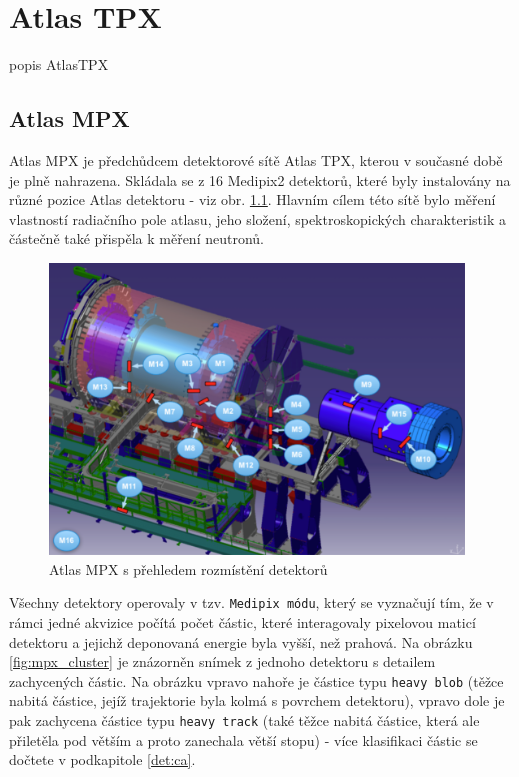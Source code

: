 

\chapter{Atlas TPX}\label{atlas}
\todo popis AtlasTPX

\section{Atlas MPX}\label{atlas:mpx}
Atlas MPX\cite{Vykydal200935}\cite{atlasmpx} je předchůdcem detektorové sítě Atlas TPX, kterou v současné době je plně nahrazena. Skládala se z 16 Medipix2 detektorů, které byly instalovány na různé pozice Atlas detektoru - viz obr. \ref{fig:mpx_positions}. Hlavním cílem této sítě bylo měření vlastností radiačního pole atlasu, jeho složení, spektroskopických charakteristik a částečně také přispěla k měření neutronů. 

\begin{figure}[ht]
	\begin{center}
		\includegraphics[width=11cm]{figures/mpx_positions.png}
		\caption{Atlas MPX s přehledem rozmístění detektorů}
		\label{fig:mpx_positions}
	\end{center}
\end{figure}

Všechny detektory operovaly v tzv. \texttt{Medipix módu}, který se vyznačují tím, že v rámci jedné akvizice počítá počet částic, které interagovaly pixelovou maticí detektoru a jejichž deponovaná energie byla vyšší, než prahová. Na obrázku \ref{fig:mpx_cluster} je znázorněn snímek z jednoho detektoru s detailem zachycených částic. Na obrázku vpravo nahoře je částice typu \texttt{heavy blob} (těžce nabitá částice, jejíž trajektorie byla kolmá s povrchem detektoru), vpravo dole je pak zachycena částice typu \texttt{heavy track} (také těžce nabitá částice, která ale přiletěla pod větším a proto zanechala větší stopu) - více klasifikaci částic se dočtete v podkapitole \ref{det:ca}.



